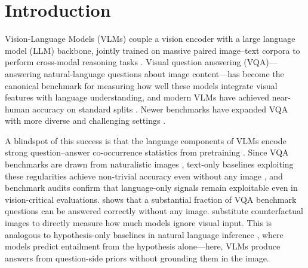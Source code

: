 \documentclass[letterpaper]{article}
\begin{document}
\section{Introduction}

Vision-Language Models (VLMs) couple a vision encoder with a large language
model (LLM) backbone, jointly trained on massive paired image--text corpora to
perform cross-modal reasoning tasks \citep{liu2023visual,zhang2023multimodal}.
Visual question answering (VQA)---answering natural-language questions about
image content---has become the canonical benchmark for measuring how well these
models integrate visual features with language understanding, and modern VLMs have achieved near-human accuracy on standard splits \citep{antol2015vqa,goyal2016making}. Newer benchmarks have expanded VQA with more diverse and challenging settings \citep{hudson2019gqa,marino2019okvqa,yue2024mmmu}.

A blindspot of this success is that the language components of VLMs encode strong question--answer co-occurrence statistics from pretraining \citep{mccoy2024embers}. Since VQA benchmarks are drawn from naturalistic images \citep{torralba2011unbiased},
text-only baselines exploiting these regularities achieve non-trivial
accuracy even without any image \citep{jabri2016revisiting,zhang2016yin,agrawal2018dont},
and benchmark audits confirm that language-only signals remain exploitable
even in vision-critical evaluations. \citet{chen2024are} shows that a substantial
fraction of VQA benchmark questions can be answered correctly
without any image. \citet{lee2024vlind} substitute counterfactual images to directly measure how much models ignore visual input.
This is analogous to hypothesis-only baselines in natural language inference \citep{poliak2018hypothesis}, where models predict entailment from the
hypothesis alone---here, VLMs produce answers from question-side priors without grounding them in the image.
\end{document}
